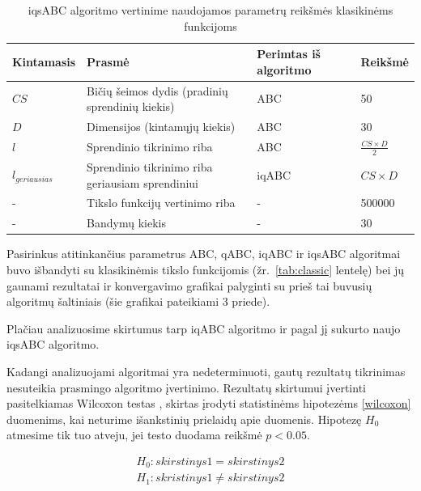 \documentclass{VUMIFKompMagistrinis}
\begin{document}
\begin{table}[H]
\centering
\caption{iqsABC algoritmo vertinime naudojamos parametrų reikšmės klasikinėms funkcijoms}
\label{tab:par}
\begin{tabular}{llXl}
Kintamasis&Prasmė&Perimtas iš algoritmo&Reikšmė \\
\hline
$CS$ & Bičių šeimos dydis (pradinių sprendinių kiekis) & ABC & 50 \\ \hline
$D$& Dimensijos (kintamųjų kiekis) & ABC & $30$ \\ \hline
$l$ & Sprendinio tikrinimo riba & ABC & $\frac{CS\times D}{2}$ \\ \hline
$l_{geriausias}$ & Sprendinio tikrinimo riba geriausiam sprendiniui & iqABC & $CS \times D$\\ \hline
-& Tikslo funkcijų vertinimo riba & - & 500000\\ \hline
-& Bandymų kiekis & - & $30$

\end{tabular}
\end{table}

Pasirinkus atitinkančius parametrus ABC, qABC, iqABC ir iqsABC algoritmai buvo išbandyti su klasikinėmis tikslo funkcijomis (žr.~\ref{tab:classic} lentelę)  bei jų gaunami rezultatai ir konvergavimo grafikai palyginti su prieš tai buvusių algoritmų šaltiniais (šie grafikai pateikiami 3 priede).

Plačiau analizuosime skirtumus tarp iqABC algoritmo ir pagal jį sukurto naujo iqsABC algoritmo.



Kadangi analizuojami algoritmai yra nedeterminuoti, gautų rezultatų tikrinimas nesuteikia prasmingo algoritmo įvertinimo. Rezultatų skirtumui įvertinti pasitelkiamas Wilcoxon testas \cite{Wil45}, skirtas įrodyti statistinėms hipotezėms \eqref{wilcoxon} duomenims, kai neturime išankstinių prielaidų apie duomenis. Hipotezę $H_{0}$ atmesime tik tuo atveju, jei testo duodama reikšmė $p<0.05$. %



\begin{equation}\label{wilcoxon}
\begin{matrix}
H_{0}: skirstinys1 = skirstinys2 \\
H_{1}: skristinys1 \neq skirstinys2
\end{matrix}
\end{equation}
\end{document}
